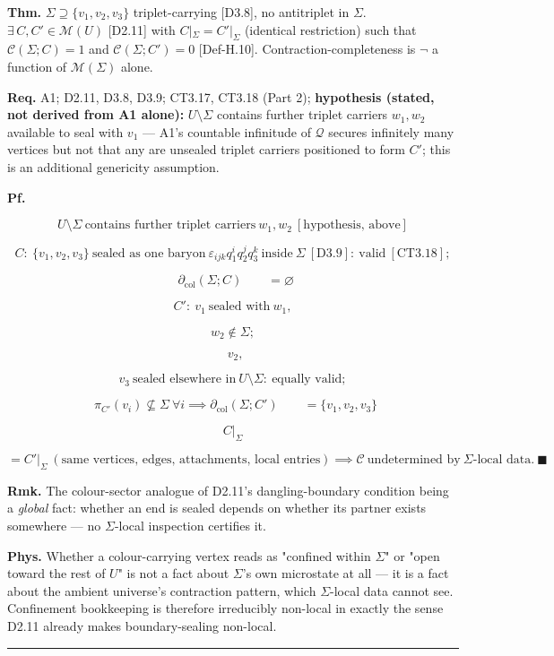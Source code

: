 \begin{theorem}\label{tag:FT-18}
\textbf{Thm.} $\Sigma\supseteq\{v_1,v_2,v_3\}$ triplet-carrying [D3.8], no antitriplet in $\Sigma$. $\exists\,C,C'\in\mathcal M(U)$ [D2.11] with $C|_\Sigma=C'|_\Sigma$ (identical restriction) such that $\mathcal C(\Sigma;C)=1$ and $\mathcal C(\Sigma;C')=0$ [Def-H.10]. Contraction-completeness is $\neg$ a function of $\mathcal M(\Sigma)$ alone.

\textbf{Req.} A1; D2.11, D3.8, D3.9; CT3.17, CT3.18 (Part 2); \textbf{hypothesis (stated, not derived from A1 alone):} $U\setminus\Sigma$ contains further triplet carriers $w_1,w_2$ available to seal with $v_1$ — A1's countable infinitude of $\mathcal Q$ secures infinitely many vertices but not that any are unsealed triplet carriers positioned to form $C'$; this is an additional genericity assumption.

\textbf{Pf.}

\[
U\setminus\Sigma\ \text{contains further triplet carriers}\ w_1,w_2\ [\text{hypothesis, above}]
\]

\[
C:\ \{v_1,v_2,v_3\}\ \text{sealed as one baryon}\ \varepsilon_{ijk}q_1^iq_2^jq_3^k\ \text{inside}\ \Sigma\ [\mathrm{D3.9}]:\ \text{valid}\ [\mathrm{CT3.18}];
\]

\[
\ \ \partial_{\mathrm{col}}(\Sigma;C)\qquad = \varnothing
\]

\[
C':\ v_1\ \text{sealed with}\ w_1,
\]

\[
w_2\notin\Sigma;
\]

\[
\ \ v_2,
\]

\[
v_3\ \text{sealed elsewhere in}\ U\setminus\Sigma:\ \text{equally valid};
\]

\[
\ \ \pi_{C'}(v_i)\not\subseteq\Sigma\ \forall i\implies\partial_{\mathrm{col}}(\Sigma;C')\qquad = \{v_1,v_2,v_3\}
\]

\[
C|_\Sigma
\]

\[
= C'|_\Sigma\ (\text{same vertices, edges, attachments, local entries})\implies\mathcal C\ \text{undetermined by}\ \Sigma\text{-local data}.\ \blacksquare
\]

\textbf{Rmk.} The colour-sector analogue of D2.11's dangling-boundary condition being a \textit{global} fact: whether an end is sealed depends on whether its partner exists somewhere — no $\Sigma$-local inspection certifies it.

\textbf{Phys.} Whether a colour-carrying vertex reads as "confined within $\Sigma$" or "open toward the rest of $U$" is not a fact about $\Sigma$'s own microstate at all — it is a fact about the ambient universe's contraction pattern, which $\Sigma$-local data cannot see. Confinement bookkeeping is therefore irreducibly non-local in exactly the sense D2.11 already makes boundary-sealing non-local.

\vspace{2pt}\noindent\rule{\textwidth}{0.4pt}\vspace{2pt}

\end{theorem}

